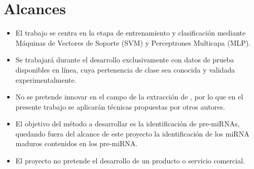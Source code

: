 %
%
%
\section{Alcances}
%
\begin{itemize}
\item El trabajo se centra en la etapa de entrenamiento y
  clasificación mediante Máquinas de Vectores de Soporte (SVM) y
  Perceptrones Multicapa (MLP).
\item Se trabajará durante el desarrollo exclusivamente con datos de
  prueba disponibles en línea, cuya pertenencia de clase sea conocida y
  validada experimentalmente.
\item No se pretende innovar en el campo de la extracción de
  , por lo que en el presente trabajo se aplicarán técnicas
  propuestas por otros autores.
\item El objetivo del método a desarrollar es la identificación de
  pre-miRNAs, quedando fuera del alcance de este proyecto la
  identificación de los miRNA maduros contenidos en los pre-miRNA.
\item El proyecto no pretende el desarrollo de un producto o servicio
  comercial.
\end{itemize}
%
